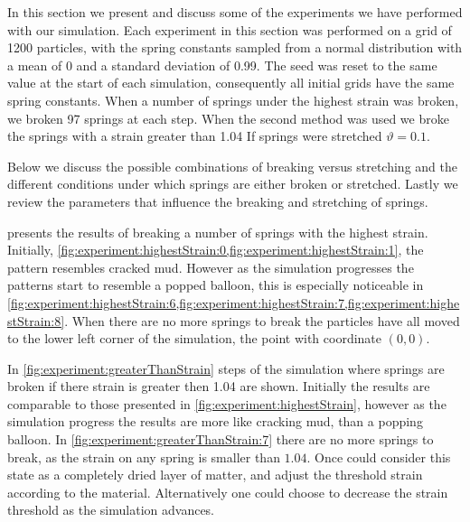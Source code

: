 In this section we present and discuss some of the experiments we have performed with our simulation. Each experiment in this section was performed on a grid of 1200 particles, with the spring constants sampled from a normal distribution with a mean of 0 and a standard deviation of 0.99. The seed was reset to the same value at the start of each simulation, consequently all initial grids have the same spring constants. When a number of springs under the highest strain was broken, we broken 97 springs at each step. When the second method was used we broke the springs with a strain greater than 1.04 If springs were stretched $\vartheta = 0.1$.

Below we discuss the possible combinations of breaking versus stretching and the different conditions under which springs are either broken or stretched. Lastly we review the parameters that influence the breaking and stretching of springs.

	\begin{figure*}
		\centering
							
		\caption{Several steps of the simulation where at each step where springs were broken the 97 springs with the highest strain are broken.}
		\label{fig:experiment:highestStrain}
	\end{figure*}
	 presents the results of breaking a number of springs with the highest strain. Initially, \cref{fig:experiment:highestStrain:0,fig:experiment:highestStrain:1}, the pattern resembles cracked mud. However as the simulation progresses the patterns start to resemble a popped balloon, this is especially noticeable in \cref{fig:experiment:highestStrain:6,fig:experiment:highestStrain:7,fig:experiment:highestStrain:8}. When there are no more springs to break the particles have all moved to the lower left corner of the simulation, the point with coordinate $(0,0)$.

	\begin{figure*}
		\centering
							
		\caption{Several steps of the simulation where at each step where springs are broken the springs with a strain greater than 1.04 are broken.}
		\label{fig:experiment:greaterThanStrain}
	\end{figure*}
	In \cref{fig:experiment:greaterThanStrain} steps of the simulation where springs are broken if there strain is greater then 1.04 are shown. Initially the results are comparable to those presented in \cref{fig:experiment:highestStrain}, however as the simulation progress the results are more like cracking mud, than a popping balloon. In \cref{fig:experiment:greaterThanStrain:7} there are no more springs to break, as the strain on any spring is smaller than $1.04$. Once could consider this state as a completely dried layer of matter, and adjust the threshold strain according to the material. Alternatively one could choose to decrease the strain threshold as the simulation advances.
	

